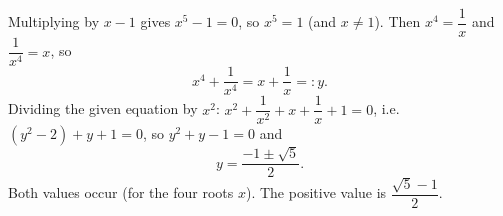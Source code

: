 Multiplying by $x-1$ gives $x^5-1=0$, so $x^5=1$ (and $x\ne1$). Then $x^4=\dfrac{1}{x}$ and $\dfrac{1}{x^4}=x$, so
\[
x^4+\dfrac{1}{x^4}=x+\dfrac{1}{x}=:y .
\]
Dividing the given equation by $x^2$: $x^2+\dfrac{1}{x^2}+x+\dfrac{1}{x}+1=0$, i.e.\ $(y^2-2)+y+1=0$, so $y^2+y-1=0$ and
\[
y=\dfrac{-1\pm\sqrt5}{2}.
\]
Both values occur (for the four roots $x$). The positive value is $\boxed{\dfrac{\sqrt5-1}{2}}$.
